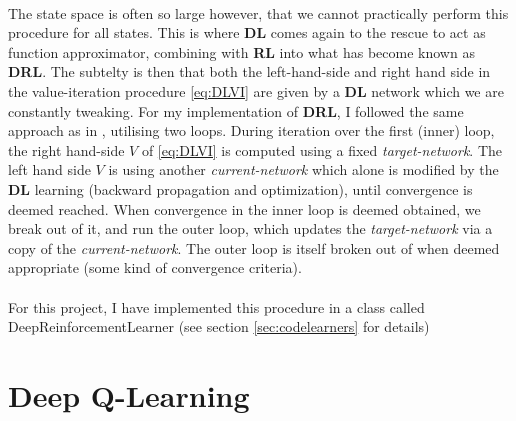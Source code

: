 \\
The state space is often so large however, that we cannot practically perform this procedure for all states. This is where \textbf{DL} comes again to the rescue to act as function approximator, combining with \textbf{RL} into what has become known as \textbf{DRL}. The subtelty is then that both the left-hand-side and right hand side in the value-iteration procedure \ref{eq:DLVI} are given by a \textbf{DL} network which we are constantly tweaking. For my implementation of \textbf{DRL}, I followed the same approach as in \cite{Mnih2013}, utilising two loops. During iteration over the first (inner) loop, the right hand-side $V$ of \ref{eq:DLVI} is computed using a fixed \textit{target-network}. The left hand side $V$ is using another \textit{current-network} which alone is modified by the \textbf{DL} learning (backward propagation and optimization), until convergence is deemed reached. When convergence in the inner loop is deemed obtained, we break out of it, and run the outer loop, which updates the \textit{target-network} via a copy of the \textit{current-network}. The outer loop is itself broken out of when deemed appropriate (some kind of convergence criteria).
\\
\\
For this project, I have implemented this procedure in a class called DeepReinforcementLearner (see section \ref{sec:codelearners} for details)



\section{Deep Q-Learning}

